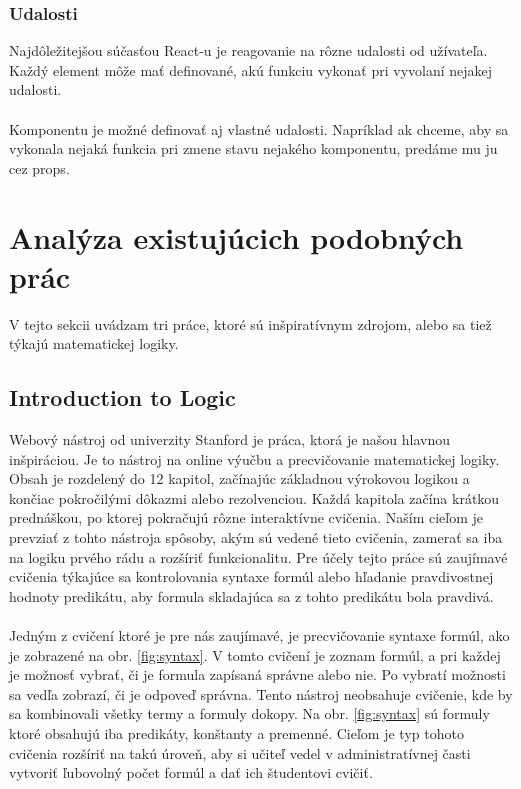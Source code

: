 \subsubsection{Udalosti}
Najdôležitejšou súčasťou React-u je reagovanie na rôzne udalosti od užívateľa. Každý element môže mať definované, akú funkciu vykonať pri vyvolaní nejakej udalosti. 
\paragraph{}
Komponentu je možné definovať aj vlastné udalosti. Napríklad ak chceme, aby sa vykonala nejaká funkcia pri zmene stavu nejakého komponentu, predáme mu ju cez props.



\section{Analýza existujúcich podobných prác}
V tejto sekcii uvádzam tri práce, ktoré sú inšpiratívnym zdrojom, alebo sa tiež týkajú matematickej logiky.

\subsection{Introduction to Logic}
Webový nástroj od univerzity Stanford \cite{intro_to_logic} je práca, ktorá je našou hlavnou inšpiráciou. Je to nástroj na online výučbu a precvičovanie matematickej logiky. Obsah je rozdelený do 12 kapitol, začínajúc základnou výrokovou logikou a končiac pokročilými dôkazmi alebo rezolvenciou. Každá kapitola začína krátkou prednáškou, po ktorej pokračujú rôzne interaktívne cvičenia. Naším cieľom je prevziať z tohto nástroja spôsoby, akým sú vedené tieto cvičenia, zamerať sa iba na logiku prvého rádu a rozšíriť funkcionalitu. Pre účely tejto práce sú zaujímavé cvičenia týkajúce sa kontrolovania syntaxe formúl alebo hľadanie pravdivostnej hodnoty predikátu, aby formula skladajúca sa z tohto predikátu bola pravdivá.

\paragraph{}
Jedným z cvičení ktoré je pre nás zaujímavé, je precvičovanie syntaxe formúl, ako je zobrazené na obr. \ref{fig:syntax}. V tomto cvičení je zoznam formúl, a pri každej je možnosť vybrať, či je formula zapísaná správne alebo nie. Po vybratí možnosti sa vedľa zobrazí, či je odpoveď správna. Tento nástroj neobsahuje cvičenie, kde by sa kombinovali všetky termy a formuly dokopy. Na obr. \ref{fig:syntax} sú formuly ktoré obsahujú iba predikáty, konštanty a premenné. Cieľom je typ tohoto cvičenia rozšíriť na takú úroveň, aby si učiteľ vedel v administratívnej časti vytvoriť ľubovolný počet formúl a dať ich študentovi cvičiť. 

